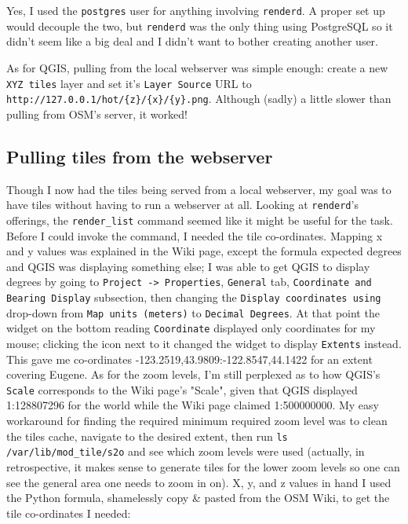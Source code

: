 \documentclass{article}
\begin{document}
Yes, I used the \texttt{postgres} user for anything involving \texttt{renderd}.  A proper set up would decouple the two, but \texttt{renderd} was the only thing using PostgreSQL so it didn't seem like a big deal and I didn't want to bother creating another user.

As for QGIS, pulling from the local webserver was simple enough: create a new \texttt{XYZ tiles} layer and set it's \texttt{Layer Source} URL to \verb|http://127.0.0.1/hot/{z}/{x}/{y}.png|.  Although (sadly) a little slower than pulling from OSM's server, it worked!

\subsection{Pulling tiles from the webserver}
Though I now had the tiles being served from a local webserver, my goal was to have tiles without having to run a webserver at all.  Looking at \texttt{renderd}'s offerings, the \texttt{render_list} command seemed like it might be useful for the task.  Before I could invoke the command, I needed the tile co-ordinates.  Mapping x and y values was explained in the  Wiki page, except the formula expected degrees and QGIS was displaying something else; I was able to get QGIS to display degrees by going to \texttt{Project -> Properties}, \texttt{General} tab, \texttt{Coordinate and Bearing Display} subsection, then changing the \texttt{Display coordinates using} drop-down from \texttt{Map units (meters)} to \texttt{Decimal Degrees}.  At that point the widget on the bottom reading \texttt{Coordinate} displayed only coordinates for my mouse; clicking the icon next to it changed the widget to display \texttt{Extents} instead.  This gave me co-ordinates -123.2519,43.9809:-122.8547,44.1422 for an extent covering Eugene.  As for the zoom levels, I'm still perplexed as to how QGIS's \texttt{Scale} corresponds to the  Wiki page's "Scale", given that QGIS displayed 1:128807296 for the world while the Wiki page claimed 1:500000000.  My easy workaround for finding the required minimum required zoom level was to clean the tiles cache, navigate to the desired extent, then run \texttt{ls /var/lib/mod_tile/s2o} and see which zoom levels were used (actually, in retrospective, it makes sense to generate tiles for the lower zoom levels so one can see the general area one needs to zoom in on).  X, y, and z values in hand I used the Python formula, shamelessly copy \& pasted from the OSM Wiki, to get the tile co-ordinates I needed:
\end{document}
